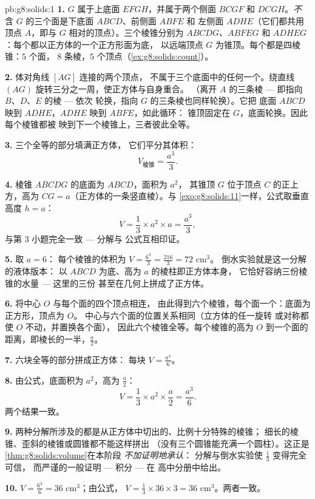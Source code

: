 \begin{solution}{pb:g8:solids:1}
\textbf{1.} $G$ 属于上底面 $EFGH$，并属于两个侧面
$BCGF$ 和 $DCGH$。\emph{不}
含 $G$ 的三个面是下底面 $ABCD$、前侧面 $ABFE$ 和
左侧面 $ADHE$（它们都共用顶点 $A$，即与
$G$ 相对的顶点）。三个棱锥分别为 $ABCDG$、$ABFEG$ 和
$ADHEG$：每个都以正方体的一个正方形面为底，
以远端顶点 $G$ 为锥顶。每个都是四棱锥：$5$ 个面，
$8$ 条棱，$5$ 个顶点（\cref{ex:g8:solids:count}）。

\textbf{2.} 体对角线 $[AG]$ 连接的两个顶点，
不属于三个底面中的任何一个。绕直线
$(AG)$ 旋转三分之一周，使正方体与自身重合。
（离开 $A$ 的三条棱 --- 即指向 $B$、$D$、$E$ 的棱 --- 依次
轮换，指向 $G$ 的三条棱也同样轮换）。它把
底面 $ABCD$ 映到 $ADHE$，$ADHE$ 映到 $ABFE$，如此循环：
锥顶固定在 $G$，底面轮换。因此每个棱锥都被
映到下一个棱锥上，三者彼此全等。

\textbf{3.} 三个全等的部分填满正方体，
它们平分其体积：
\[
V_{\text{棱锥}} = \frac{a^3}{3} .
\]

\textbf{4.} 棱锥 $ABCDG$ 的底面为 $ABCD$，面积为 $a^2$，
其锥顶 $G$ 位于顶点 $C$ 的正上方，高为
$CG = a$（正方体的一条竖直棱）。与
\cref{exo:g8:solids:11}一样，公式取垂直高度
$h = a$：
\[
V = \frac13 \times a^2 \times a = \frac{a^3}{3} ,
\]
与第 3 小题完全一致 --- 分解与
公式互相印证。

\textbf{5.} 取 $a = 6$：
每个棱锥的体积为 $V = \frac{6^3}{3} = \frac{216}{3} = 72$ cm$^3$。
倒水实验就是这一分解的液体版本：
以 $ABCD$ 为底、高为 $a$ 的棱柱即正方体本身，
它恰好容纳三份棱锥的水量 --- 这里的三份
甚至在几何上拼成了正方体。

\textbf{6.} 将中心 $O$ 与每个面的四个顶点相连，
由此得到六个棱锥，每个面一个：底面为正方形，顶点为 $O$。
中心与六个面的位置关系相同（立方体的任一旋转
或对称都使 $O$ 不动，并置换各个面），
因此六个棱锥全等。每个棱锥的高为
$O$ 到一个面的距离，即棱长的一半，$\frac{a}{2}$。

\textbf{7.} 六块全等的部分拼成正方体：
每块 $V = \frac{a^3}{6}$。

\textbf{8.} 由公式，底面积为 $a^2$，高为 $\frac a2$：
\[
V = \frac13 \times a^2 \times \frac{a}{2} = \frac{a^3}{6} .
\]
两个结果一致。

\textbf{9.} 两种分解所涉及的都是从正方体中切出的、比例十分特殊的棱锥；
细长的棱锥、歪斜的棱锥或圆锥都不能这样拼出
（没有三个圆锥能充满一个圆柱）。这正是
\cref{thm:g8:solids:volume}在本阶段
\emph{不加证明地承认}：
分解与倒水实验使 $\frac13$ 变得完全可信，
而严谨的一般证明 --- 积分 --- 在
高中分册中给出。

\textbf{10.} $V = \frac{6^3}{6} = 36$ cm$^3$；由公式，
$V = \frac13 \times 36 \times 3 = 36$ cm$^3$。两者一致。


\end{solution}
